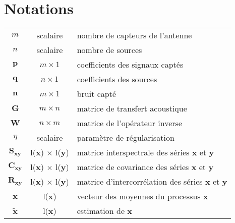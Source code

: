 \documentclass[twocolumn, 11pt, landscape]{article}
\begin{document}
\newpage
\section*{Notations}

\begin{center}
	
	\begin{tabularx}{0.5\textwidth}{c c X}
		$m$			&	scalaire		&	nombre de capteurs de l'antenne\\
		$n$			&	scalaire		&	nombre de sources\\
	    $\bm{p}$		& $m\times 1$	&	coefficients des signaux captés\\
	    $\bm{q}$		& $n \times 1$	& 	coefficients des sources\\
	    $\bm{n}$		& $m\times 1$	&	bruit capté\\
		$\bm{G}$		& $m\times n$	&	matrice de transfert acoustique\\
		$\bm{W}$		&	$n\times m$	&	matrice de l'opérateur inverse\\
		$\eta$		& scalaire		&	paramètre de régularisation\\
		$\bm{S_{xy}}$& l($\bm{x}$) $\times$ l($\bm{y}$) & matrice interspectrale des séries $\bm{x}$ et $\bm{y}$\\
		$\bm{C_{xy}}$&	l($\bm{x}$) $\times$ l($\bm{y}$) & matrice de covariance des séries $\bm{x}$ et $\bm{y}$\\
		$\bm{R_{xy}}$&	l($\bm{x}$) $\times$ l($\bm{y}$) & matrice d'intercorrélation des séries $\bm{x}$ et $\bm{y}$\\
		$\bm{\bar{x}}$	& l($\bm{x}$)	& vecteur des moyennes du processus $\bm{x}$\\
		$\bm{\tilde{x}}$	& l($\bm{x}$)	& estimation de $\bm{x}$
		
	\end{tabularx}
\end{center}


\newpage  	

\newpage
\tableofcontents
\newpage


%
\newpage

\end{document}

